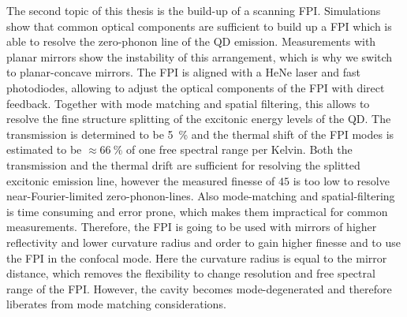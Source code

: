 The second topic of this thesis is the build-up of a scanning \ac{FPI}.
Simulations show that common optical components are sufficient to build up a \ac{FPI} which is able to resolve the zero-phonon line of the \ac{QD} emission.
Measurements with planar mirrors show the instability of this arrangement, which is why we switch to planar-concave mirrors.
The \ac{FPI} is aligned with a HeNe laser and fast photodiodes, allowing to adjust the optical components of the \ac{FPI} with direct feedback.
Together with mode matching and spatial filtering, this allows to resolve the fine structure splitting of the excitonic energy levels of the \ac{QD}.
The transmission is determined to be \SI{5}{\percent} and the thermal shift of the \ac{FPI} modes is estimated to be $\approx \SI{66}{\percent}$ of one free spectral range per Kelvin.
Both the transmission and the thermal drift are sufficient for resolving the splitted excitonic emission line, however the measured finesse of $45$ is too low to resolve near-Fourier-limited zero-phonon-lines.
Also mode-matching and spatial-filtering is time consuming and error prone, which makes them impractical for common measurements.
Therefore, the \ac{FPI} is going to be used with mirrors of higher reflectivity and lower curvature radius and order to gain higher finesse and to use the \ac{FPI} in the confocal mode.
Here the curvature radius is equal to the mirror distance, which removes the flexibility to change resolution and free spectral range of the \ac{FPI}.
However, the cavity becomes mode-degenerated and therefore liberates from mode matching considerations.
